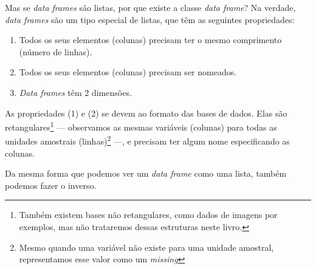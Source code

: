 \documentclass[
]{book}
\newenvironment{Shaded}{\begin{snugshade}}{\end{snugshade}}
\newcommand{\AttributeTok}[1]{\textcolor[rgb]{0.77,0.63,0.00}{#1}}
\newcommand{\ConstantTok}[1]{\textcolor[rgb]{0.00,0.00,0.00}{#1}}
\newcommand{\DecValTok}[1]{\textcolor[rgb]{0.00,0.00,0.81}{#1}}
\newcommand{\DocumentationTok}[1]{\textcolor[rgb]{0.56,0.35,0.01}{\textbf{\textit{#1}}}}
\newcommand{\FunctionTok}[1]{\textcolor[rgb]{0.00,0.00,0.00}{#1}}
\newcommand{\NormalTok}[1]{#1}
\newcommand{\OtherTok}[1]{\textcolor[rgb]{0.56,0.35,0.01}{#1}}
\newcommand{\StringTok}[1]{\textcolor[rgb]{0.31,0.60,0.02}{#1}}
\begin{document}
Mas se \emph{data frames} são listas, por que existe a classe \emph{data frame}? Na verdade, \emph{data frames} são um tipo especial de listas, que têm as seguintes propriedades:

\begin{enumerate}
\def\labelenumi{\arabic{enumi}.}
\item
  Todos os seus elementos (colunas) precisam ter o mesmo comprimento (número de linhas).
\item
  Todos os seus elementos (colunas) precisam ser nomeados.
\item
  \emph{Data frames} têm 2 dimensões.
\end{enumerate}

As propriedades (1) e (2) se devem ao formato das bases de dados. Elas são retangulares\footnote{Também existem bases não retangulares, como dados de imagens por exemplos, mas não trataremos dessas estruturas neste livro.} --- observamos as mesmas variáveis (colunas) para todas as unidades amostrais (linhas)\footnote{Mesmo quando uma variável não existe para uma unidade amostral, representamos esse valor como um \emph{missing}} ---, e precisam ter algum nome especificando as colunas.

Da mesma forma que podemos ver um \emph{data frame} como uma lista, também podemos fazer o inverso.

\begin{Shaded}
\end{Shaded}
\end{document}
